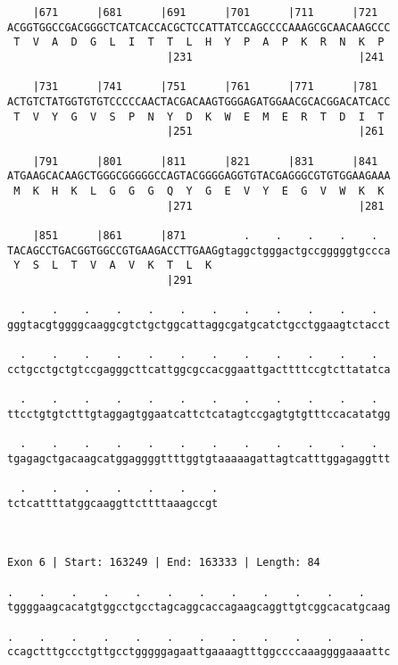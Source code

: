 \documentclass{article}
\begin{document}
\begin{Verbatim}
    |671      |681      |691      |701      |711      |721  
ACGGTGGCCGACGGGCTCATCACCACGCTCCATTATCCAGCCCCAAAGCGCAACAAGCCC
 T  V  A  D  G  L  I  T  T  L  H  Y  P  A  P  K  R  N  K  P 
                         |231                          |241 
  
    |731      |741      |751      |761      |771      |781  
ACTGTCTATGGTGTGTCCCCCAACTACGACAAGTGGGAGATGGAACGCACGGACATCACC
 T  V  Y  G  V  S  P  N  Y  D  K  W  E  M  E  R  T  D  I  T 
                         |251                          |261 
  
    |791      |801      |811      |821      |831      |841  
ATGAAGCACAAGCTGGGCGGGGGCCAGTACGGGGAGGTGTACGAGGGCGTGTGGAAGAAA
 M  K  H  K  L  G  G  G  Q  Y  G  E  V  Y  E  G  V  W  K  K 
                         |271                          |281 
  
    |851      |861      |871         .    .    .    .    .  
TACAGCCTGACGGTGGCCGTGAAGACCTTGAAGgtaggctgggactgccgggggtgccca
 Y  S  L  T  V  A  V  K  T  L  K                            
                         |291                               
  
  .    .    .    .    .    .    .    .    .    .    .    .  
gggtacgtggggcaaggcgtctgctggcattaggcgatgcatctgcctggaagtctacct
                                                            
  .    .    .    .    .    .    .    .    .    .    .    .  
cctgcctgctgtccgagggcttcattggcgccacggaattgacttttccgtcttatatca
                                                            
  .    .    .    .    .    .    .    .    .    .    .    .  
ttcctgtgtctttgtaggagtggaatcattctcatagtccgagtgtgtttccacatatgg
                                                            
  .    .    .    .    .    .    .    .    .    .    .    .  
tgagagctgacaagcatggaggggttttggtgtaaaaagattagtcatttggagaggttt
                                                            
  .    .    .    .    .    .    .
tctcattttatggcaaggttcttttaaagccgt
                                 
                                 
 
Exon 6 | Start: 163249 | End: 163333 | Length: 84
 
.    .    .    .    .    .    .    .    .    .    .    .    
tggggaagcacatgtggcctgcctagcaggcaccagaagcaggttgtcggcacatgcaag
                                                            
.    .    .    .    .    .    .    .    .    .    .    .    
ccagctttgccctgttgcctgggggagaattgaaaagtttggccccaaaggggaaaattc
                                                            

\end{Verbatim}
\end{document}
